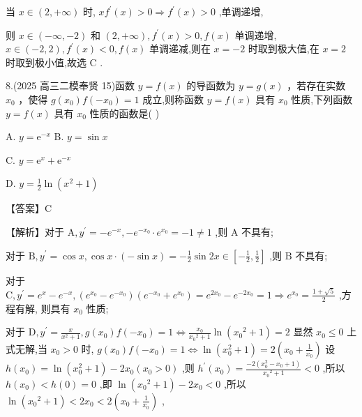 \documentclass[10pt]{article}
\begin{document}
当 \(x \in  \left( {2, + \infty }\right)\) 时, \(x{f}^{\prime }\left( x\right)  > 0 \Rightarrow  {f}^{\prime }\left( x\right)  > 0\) ,单调递增,

则 \(x \in  \left( {-\infty , - 2}\right)\) 和 \(\left( {2, + \infty }\right) ,{f}^{\prime }\left( x\right)  > 0,f\left( x\right)\) 单调递增, \(x \in  \left( {-2,2}\right) ,{f}^{\prime }\left( x\right)  < 0,f\left( x\right)\) 单调递减,则在 \(x =  - 2\) 时取到极大值,在 \(x = 2\) 时取到极小值,故选 \(\mathrm{C}\) .

8.(2025 高三二模奉贤 15)函数 \(y = f\left( x\right)\) 的导函数为 \(y = g\left( x\right)\) ，若存在实数 \({x}_{0}\) ，使得 \(g\left( {x}_{0}\right) f\left( {-{x}_{0}}\right)  = 1\) 成立,则称函数 \(y = f\left( x\right)\) 具有 \({x}_{0}\) 性质,下列函数 \(y = f\left( x\right)\) 具有 \({x}_{0}\) 性质的函数是( )

A. \(y = {\mathrm{e}}^{-x}\) B. \(y = \sin x\)

C. \(y = {\mathrm{e}}^{x} + {\mathrm{e}}^{-x}\)

D. \(y = \frac{1}{2}\ln \left( {{x}^{2} + 1}\right)\)

【答案】C

【解析】对于 \(\mathrm{A},{y}^{\prime } =  - {e}^{-x}, - {e}^{-{x}_{0}} \cdot  {e}^{{x}_{0}} =  - 1 \neq  1\) ,则 \(\mathrm{A}\) 不具有;

对于 \(\mathrm{B},{y}^{\prime } = \cos x,\cos x \cdot  \left( {-\sin x}\right)  =  - \frac{1}{2}\sin {2x} \in  \left\lbrack  {-\frac{1}{2},\frac{1}{2}}\right\rbrack\) ,则 \(\mathrm{B}\) 不具有;

对于 \(\mathrm{C},{y}^{\prime } = {e}^{x} - {e}^{-x},\left( {{e}^{{x}_{0}} - {e}^{-{x}_{0}}}\right) \left( {{e}^{-{x}_{0}} + {e}^{{x}_{0}}}\right)  = {e}^{2{x}_{0}} - {e}^{-2{x}_{0}} = 1 \Rightarrow  {e}^{{x}_{0}} = \frac{1 + \sqrt{5}}{2}\) ,方程有解, 则具有 \({x}_{0}\) 性质;

对于 \(\mathrm{D},{y}^{\prime } = \frac{x}{{x}^{2} + 1},g\left( {x}_{0}\right) f\left( {-{x}_{0}}\right)  = 1 \Leftrightarrow  \frac{{x}_{0}}{{x}_{0}{}^{2} + 1}\ln \left( {{x}_{0}{}^{2} + 1}\right)  = 2\) 显然 \({x}_{0} \leq  0\) 上式无解,当 \({x}_{0} > 0\) 时, \(g\left( {x}_{0}\right) f\left( {-{x}_{0}}\right)  = 1 \Leftrightarrow  \ln \left( {{x}_{0}^{2} + 1}\right)  = 2\left( {{x}_{0} + \frac{1}{{x}_{0}}}\right)\) 设 \(h\left( {x}_{0}\right)  = \ln \left( {{x}_{0}^{2} + 1}\right)  - 2{x}_{0}\left( {{x}_{0} > 0}\right)\) ,则 \({h}^{\prime }\left( {x}_{0}\right)  = \frac{-2\left( {{x}_{0}^{2} - {x}_{0} + 1}\right) }{{x}_{0}{}^{2} + 1} < 0\) ,所以 \(h\left( {x}_{0}\right)  < h\left( 0\right)  = 0\) ,即 \(\ln \left( {{x}_{0}{}^{2} + 1}\right)  - 2{x}_{0} < 0\) ,所以 \(\ln \left( {{x}_{0}{}^{2} + 1}\right)  < 2{x}_{0} < 2\left( {{x}_{0} + \frac{1}{{x}_{0}}}\right)\) ,
\end{document}
